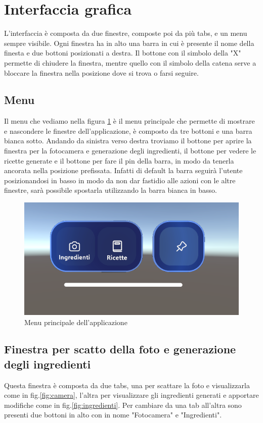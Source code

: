 \section{Interfaccia grafica}
L'interfaccia è composta da due finestre, composte poi da più tabs, e un menu sempre visibile. Ogni finestra ha in alto una barra in cui è presente il nome della finesta e due bottoni posizionati a destra. Il bottone con il simbolo della "X" permette di chiudere la finestra, mentre quello con il simbolo della catena serve a bloccare la finestra nella posizione dove si trova o farsi seguire.
\subsection{Menu}
Il menu che vediamo nella figura \ref{fig:menu} è il menu principale che permette di mostrare e nascondere le finestre dell'applicazione, è composto da tre bottoni e una barra bianca sotto. Andando da sinistra verso destra troviamo il bottone per aprire la finestra per la fotocamera e generazione degli ingredienti, il bottone per vedere le ricette generate e il bottone per fare il pin della barra, in modo da tenerla ancorata nella posizione prefissata. Infatti di default la barra seguirà l'utente posizionandosi in basso in modo da non dar fastidio alle azioni con le altre finestre, sarà possibile spostarla utilizzando la barra bianca in basso.
\begin{figure}[H]
    \centering
    \includegraphics[width=\textwidth,height=\textheight,keepaspectratio]{figures/chapter_1/MENU_interfaccia.png}
    \caption{Menu principale dell'applicazione}
    \label{fig:menu}
\end{figure}
\subsection{Finestra per scatto della foto e generazione degli ingredienti}
Questa finestra è composta da due tabs, una per scattare la foto e visualizzarla come in fig.\ref{fig:camera}, l'altra per visualizzare gli ingredienti generati e apportare modifiche come in fig.\ref{fig:ingredienti}. Per cambiare da una tab all'altra sono presenti due bottoni in alto con in nome "Fotocamera" e "Ingredienti".
